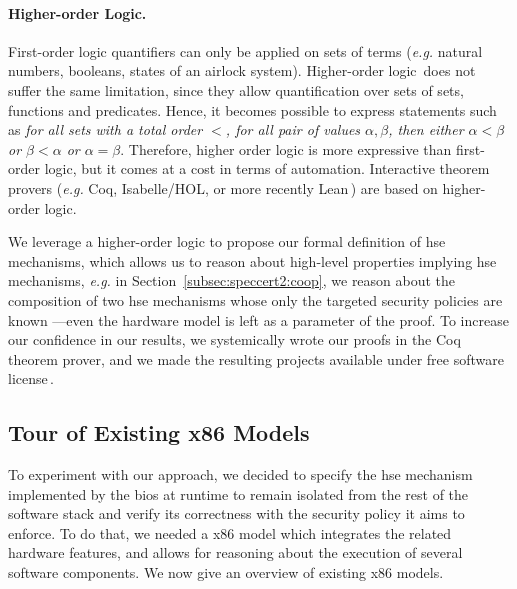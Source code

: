 \paragraph{Higher-order Logic.}
%
First-order logic quantifiers can only be applied on sets of terms (\emph{e.g.}
natural numbers, booleans, states of an airlock system).
%
Higher-order logic\,\cite{leivant1994hol} does not suffer the same limitation,
since they allow quantification over sets of sets, functions and predicates.
%
Hence, it becomes possible to express statements such as \emph{for all sets with
  a total order \( < \), for all pair of values \( \alpha, \beta \), then either
  \( \alpha < \beta \) or \( \beta < \alpha \) or \( \alpha = \beta \)}.
%
Therefore, higher order logic is more expressive than first-order logic, but it
comes at a cost in terms of automation.
%
Interactive theorem provers (\emph{e.g.}  Coq, Isabelle/HOL, or more recently
Lean\,\cite{de2015lean}) are based on higher-order logic.

We leverage a higher-order logic to propose our formal definition of \ac{hse}
mechanisms, which allows us to reason about high-level properties implying
\ac{hse} mechanisms, \emph{e.g.} in Section~\ref{subsec:speccert2:coop}, we
reason about the composition of two \ac{hse} mechanisms whose only the targeted
security policies are known ---even the hardware model is left as a parameter of
the proof.
%
To increase our confidence in our results, we systemically wrote our proofs in
the Coq theorem prover, and we made the resulting projects available under free
software license\,\cite{letan2016speccertcode,letan2018freespeccode}.

\subsection{Tour of Existing x86 Models}
\label{subsec:sota:ltsrelated}

To experiment with our approach, we decided to specify the \ac{hse} mechanism
implemented by the \ac{bios} at runtime to remain isolated from the rest of the
software stack and verify its correctness with the security policy it aims to
enforce.
%
To do that, we needed a x86 model which integrates the related hardware
features, and allows for reasoning about the execution of several software
components.
%
We now give an overview of existing x86 models.

